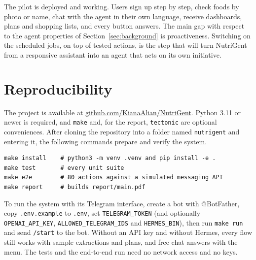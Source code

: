 \documentclass[11pt,a4paper]{article}
\newcommand{\repo}{\href{https://github.com/KianaAlian/NutriGent}{github.com/KianaAlian/NutriGent}}
\begin{document}
The pilot is deployed and working. Users sign up step by step, check foods by photo or name, chat with
the agent in their own language, receive dashboards, plans and shopping lists, and every button
answers. The main gap with respect to the agent properties of Section~\ref{sec:background} is
proactiveness. Switching on the scheduled jobs, on top of tested actions, is the step that will turn
NutriGent from a responsive assistant into an agent that acts on its own initiative.

\section{Reproducibility}\label{sec:repro}

The project is available at \repo. Python 3.11 or newer is required, and \texttt{make} and, for the
report, \texttt{tectonic} are optional conveniences. After cloning the repository into a folder named
\texttt{nutrigent} and entering it, the following commands prepare and verify the system.

\begin{center}
\begin{minipage}{0.86\textwidth}
\small
\begin{verbatim}
make install    # python3 -m venv .venv and pip install -e .
make test       # every unit suite
make e2e        # 80 actions against a simulated messaging API
make report     # builds report/main.pdf
\end{verbatim}
\end{minipage}
\end{center}

{\sloppy To run the system with its Telegram interface, create a bot with @BotFather, copy
\texttt{.env.example} to \texttt{.env}, set \texttt{TELEGRAM\_TOKEN} (and optionally
\texttt{OPENAI\_API\_KEY}, \texttt{ALLOWED\_TELEGRAM\_IDS} and \texttt{HERMES\_BIN}), then run
\texttt{make run} and send \texttt{/start} to the bot. Without an API key and without Hermes, every flow
still works with sample extractions and plans, and free chat answers with the menu. The tests and the
end-to-end run need no network access and no keys.\par}
\end{document}
